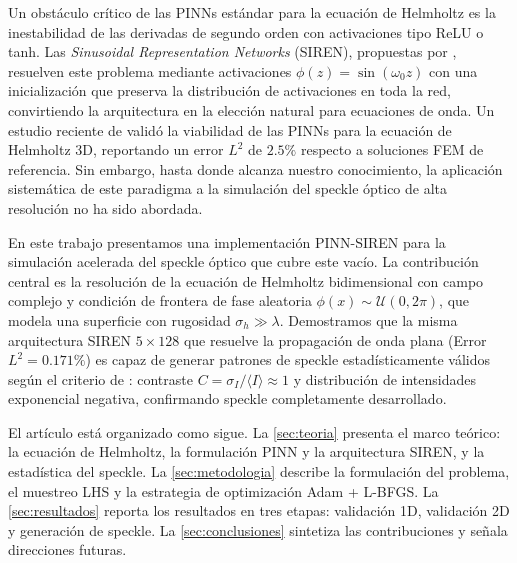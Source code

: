 Un obstáculo crítico de las PINNs estándar para la ecuación de Helmholtz es la inestabilidad
de las derivadas de segundo orden con activaciones tipo ReLU o tanh.
Las \textit{Sinusoidal Representation Networks} (SIREN), propuestas por
\citet{Sitzmann2020_SIREN}, resuelven este problema mediante activaciones
$\phi(z) = \sin(\omega_0 z)$ con una inicialización que preserva la distribución de
activaciones en toda la red, convirtiendo la arquitectura en la elección natural para
ecuaciones de onda.
Un estudio reciente de \citet{Schoder2024_PINN_acoustics} validó la viabilidad de las PINNs
para la ecuación de Helmholtz 3D, reportando un error $L^2$ de $2.5\%$ respecto a soluciones
FEM de referencia.
Sin embargo, hasta donde alcanza nuestro conocimiento, la aplicación sistemática de este
paradigma a la simulación del speckle óptico de alta resolución no ha sido abordada.

En este trabajo presentamos una implementación PINN-SIREN para la simulación acelerada del
speckle óptico que cubre este vacío.
La contribución central es la resolución de la ecuación de Helmholtz bidimensional con campo
complejo y condición de frontera de fase aleatoria $\phi(x) \sim \mathcal{U}(0, 2\pi)$,
que modela una superficie con rugosidad $\sigma_h \gg \lambda$.
Demostramos que la misma arquitectura SIREN $5\times128$ que resuelve la propagación de onda
plana (Error $L^2 = 0.171\%$) es capaz de generar patrones de speckle estadísticamente
válidos según el criterio de \citet{Goodman2007_Speckle}: contraste
$C = \sigma_I / \langle I \rangle \approx 1$ y distribución de intensidades exponencial
negativa, confirmando speckle completamente desarrollado.

El artículo está organizado como sigue.
La \cref{sec:teoria} presenta el marco teórico: la ecuación de Helmholtz, la formulación PINN
y la arquitectura SIREN, y la estadística del speckle.
La \cref{sec:metodologia} describe la formulación del problema, el muestreo LHS y la
estrategia de optimización Adam + L-BFGS.
La \cref{sec:resultados} reporta los resultados en tres etapas: validación 1D, validación 2D
y generación de speckle.
La \cref{sec:conclusiones} sintetiza las contribuciones y señala direcciones futuras.
